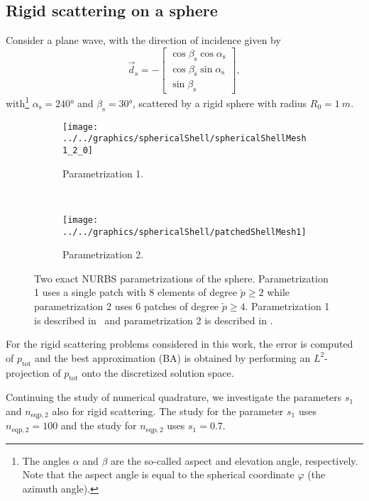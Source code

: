 \subsection{Rigid scattering on a sphere} 
Consider a plane wave, with the direction of incidence given by
\begin{equation}\label{Eq3:d_s}
	\vec{d}_{\mathrm{s}} = -\begin{bmatrix}
		\cos\beta_{\mathrm{s}}\cos\alpha_{\mathrm{s}}\\
		\cos\beta_{\mathrm{s}}\sin\alpha_{\mathrm{s}}\\
		\sin\beta_{\mathrm{s}}
	\end{bmatrix},
\end{equation}
with\footnote{The angles $\alpha$ and $\beta$ are the so-called aspect and elevation angle, respectively. Note that the aspect angle is equal to the spherical coordinate $\varphi$ (the azimuth angle).} $\alpha_{\mathrm{s}} = \ang{240}$ and $\beta_{\mathrm{s}} = \ang{30}$, scattered by a rigid sphere with radius $R_0=\SI{1}{m}$. 
\begin{figure}
	\centering
	\begin{subfigure}[t]{0.3\textwidth}
		\texttt{[image: ../../graphics/sphericalShell/sphericalShellMesh1\_2\_0]}
		\caption{Parametrization 1.}
		\label{Fig3:parm1}
	\end{subfigure} 
	~
	\begin{subfigure}[t]{0.3\textwidth}
		\texttt{[image: ../../graphics/sphericalShell/patchedShellMesh1]}
		\caption{Parametrization 2.}
		\label{Fig3:parm2}
	\end{subfigure} 
	\caption{Two exact NURBS parametrizations of the sphere. Parametrization 1 uses a single patch with 8 elements of degree $\check{p}\geq 2$ while parametrization 2 uses 6 patches of degree $\check{p}\geq 4$. Parametrization 1 is described in~ and parametrization 2 is described in .}
	\label{Fig3:SphericalShellParametrizations}
\end{figure}

For the rigid scattering problems considered in this work, the error is computed of $p_{\mathrm{tot}}$ and the best approximation (BA) is obtained by performing an $L^2$-projection of $p_{\mathrm{tot}}$ onto the discretized solution space. 

Continuing the study of numerical quadrature, we investigate the parameters $s_1$ and $n_{\mathrm{eqp},2}$ also for rigid scattering. The study for the parameter $s_1$ uses $n_{\mathrm{eqp},2}=100$ and the study for $n_{\mathrm{eqp},2}$ uses $s_1=0.7$. 

